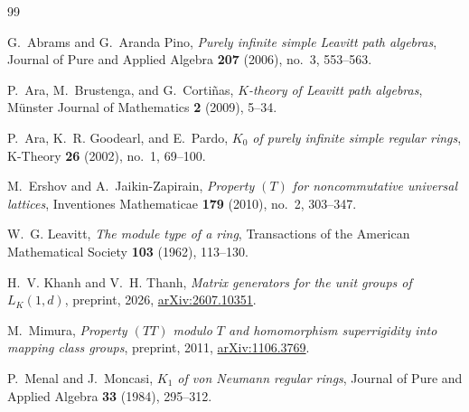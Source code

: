 \documentclass[11pt]{amsart}
\theoremstyle{definition}
\theoremstyle{plain}
\begin{document}
\begin{thebibliography}{99}

G.~Abrams and G.~Aranda Pino,
\emph{Purely infinite simple Leavitt path algebras},
Journal of Pure and Applied Algebra \textbf{207} (2006), no.~3,
553--563.

P.~Ara, M.~Brustenga, and G.~Corti\~nas,
\emph{\(K\)-theory of Leavitt path algebras},
M\"unster Journal of Mathematics \textbf{2} (2009), 5--34.

P.~Ara, K.~R. Goodearl, and E.~Pardo,
\emph{\(K_0\) of purely infinite simple regular rings},
K-Theory \textbf{26} (2002), no.~1, 69--100.

M.~Ershov and A.~Jaikin-Zapirain,
\emph{Property \((T)\) for noncommutative universal lattices},
Inventiones Mathematicae \textbf{179} (2010), no.~2, 303--347.

W.~G. Leavitt,
\emph{The module type of a ring},
Transactions of the American Mathematical Society \textbf{103} (1962), 113--130.

H.~V. Khanh and V.~H. Thanh,
\emph{Matrix generators for the unit groups of \(L_K(1,d)\)},
preprint, 2026,
\href{https://arxiv.org/abs/2607.10351}{arXiv:2607.10351}.

M.~Mimura,
\emph{Property \((TT)\) modulo \(T\) and homomorphism
superrigidity into mapping class groups},
preprint, 2011,
\href{https://arxiv.org/abs/1106.3769}{arXiv:1106.3769}.

P.~Menal and J.~Moncasi,
\emph{\(K_1\) of von Neumann regular rings},
Journal of Pure and Applied Algebra \textbf{33} (1984), 295--312.

\end{thebibliography}
\end{document}
